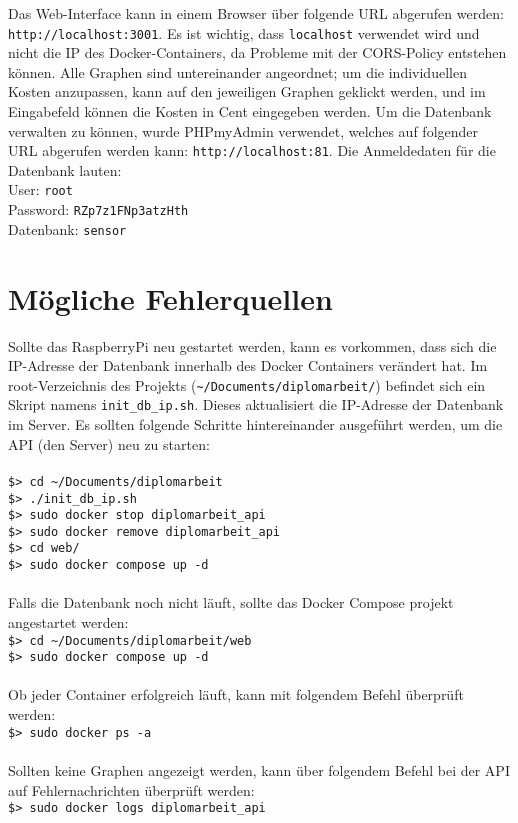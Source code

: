 
Das Web-Interface kann in einem Browser über folgende URL abgerufen werden: \verb|http://localhost:3001|.
Es ist wichtig, dass \verb|localhost| verwendet wird und nicht die IP des Docker-Containers, da 
Probleme mit der CORS-Policy entstehen können. Alle Graphen sind untereinander angeordnet; 
um die individuellen Kosten anzupassen, kann auf den jeweiligen Graphen geklickt werden, 
und im Eingabefeld können die Kosten in Cent eingegeben werden. Um die Datenbank verwalten zu können, 
wurde PHPmyAdmin verwendet, welches auf folgender URL abgerufen werden kann: \verb|http://localhost:81|.
Die Anmeldedaten für die Datenbank lauten: 
\\
User: \verb|root|
\\
Password: \verb|RZp7z1FNp3atzHth|
\\
Datenbank: \verb|sensor|

\section{Mögliche Fehlerquellen}

Sollte das RaspberryPi neu gestartet werden, kann es vorkommen, dass sich die IP-Adresse der Datenbank
innerhalb des Docker Containers verändert hat. Im root-Verzeichnis des Projekts (\verb|~/Documents/diplomarbeit/|) befindet sich ein 
Skript namens \verb|init_db_ip.sh|. Dieses aktualisiert die IP-Adresse der Datenbank im Server. 
Es sollten folgende Schritte hintereinander ausgeführt werden, um die API (den Server) neu zu starten:
\\
\\
\verb|$> cd ~/Documents/diplomarbeit|
\\
\verb|$> ./init_db_ip.sh|
\\
\verb|$> sudo docker stop diplomarbeit_api|
\\
\verb|$> sudo docker remove diplomarbeit_api|
\\
\verb|$> cd web/|
\\
\verb|$> sudo docker compose up -d|
\\
\\
Falls die Datenbank noch nicht läuft, sollte das Docker Compose projekt angestartet werden:
\\
\verb|$> cd ~/Documents/diplomarbeit/web|
\\
\verb|$> sudo docker compose up -d|
\\
\\
Ob jeder Container erfolgreich läuft, kann mit folgendem Befehl überprüft werden:
\\
\verb|$> sudo docker ps -a|
\\
\\
Sollten keine Graphen angezeigt werden, kann über folgendem Befehl bei der API auf Fehlernachrichten überprüft werden:
\\
\verb|$> sudo docker logs diplomarbeit_api|

